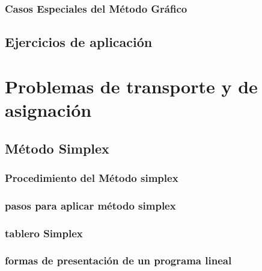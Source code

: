 \documentclass[
  letterpaper,
  DIV=11,
  numbers=noendperiod]{scrreprt}
\theoremstyle{definition}
\theoremstyle{definition}
\theoremstyle{remark}
\begin{document}
\hypertarget{casos-especiales-del-muxe9todo-gruxe1fico}{%
\subsection{Casos Especiales del Método
Gráfico}\label{casos-especiales-del-muxe9todo-gruxe1fico}}

\hypertarget{ejercicios-de-aplicaciuxf3n}{%
\section{Ejercicios de aplicación}\label{ejercicios-de-aplicaciuxf3n}}

\hypertarget{problemas-de-transporte-y-de-asignaciuxf3n}{%
\chapter{Problemas de transporte y de
asignación}\label{problemas-de-transporte-y-de-asignaciuxf3n}}

\hypertarget{muxe9todo-simplex}{%
\section{Método Simplex}\label{muxe9todo-simplex}}

\hypertarget{procedimiento-del-muxe9todo-simplex}{%
\subsection{Procedimiento del Método
simplex}\label{procedimiento-del-muxe9todo-simplex}}

\hypertarget{pasos-para-aplicar-muxe9todo-simplex}{%
\subsection{pasos para aplicar método
simplex}\label{pasos-para-aplicar-muxe9todo-simplex}}

\hypertarget{tablero-simplex}{%
\subsection{tablero Simplex}\label{tablero-simplex}}

\hypertarget{formas-de-presentaciuxf3n-de-un-programa-lineal}{%
\subsection{formas de presentación de un programa
lineal}\label{formas-de-presentaciuxf3n-de-un-programa-lineal}}
\end{document}

